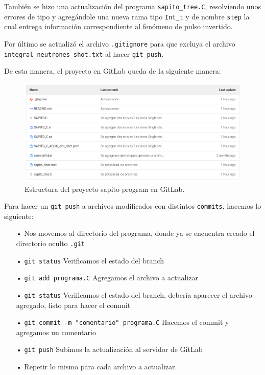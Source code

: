 \documentclass[11pt,letterpaper]{article}
\begin{document}
También se hizo una actualización del programa \verb|sapito_tree.C|, resolviendo unos errores de tipo y agregándole una nueva rama tipo \verb|Int_t| y de nombre \verb|step| la cual entrega información correspondiente al fenómeno de pulso invertido.

Por último se actualizó el archivo \verb|.gitignore| para que excluya el archivo \verb|integral_neutrones_shot.txt| al hacer \verb|git push|.

De esta manera, el proyecto en GitLab queda de la siguiente manera:

\begin{figure}[H]
    \includegraphics[width=1\textwidth]{img/Screenshot from 2021-11-22 21-17-32.png}
    \centering
    \caption{Estructura del proyecto sapito-program en GitLab.}
    \label{fig:PCG_ECG}
\end{figure}

\begin{tipt}
Para hacer un \verb|git push| a archivos modificados con distintos \verb|commits|, hacemos lo siguiente:

\begin{itemize}
\item[•]Nos movemos al directorio del programa, donde ya se encuentra creado el directorio oculto \verb|.git|
\item[•] \verb|git status| \quad Verificamos el estado del branch 
\item[•] \verb|git add programa.C| \quad Agregamos el archivo a actualizar 
\item[•] \verb|git status| \quad  Verificamos el estado del branch, debería aparecer el archivo agregado, listo para hacer el commit
\item[•] \verb|git commit -m "comentario" programa.C| \quad Hacemos el commit y agregamos un comentario 
\item[•] \verb|git push| \quad Subimos la actualización al servidor de GitLab 
\item[•] Repetir lo mismo para cada archivo a actualizar.
\end{itemize}
\end{tipt}
\end{document}
